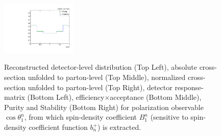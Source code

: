\begin{figure}[htb]
\begin{center}
 \includegraphics[width=0.32\textwidth]{fig_fullRun2UL/unfolding/combined/PurStab_b1n.pdf} \\
\caption{Reconstructed detector-level distribution (Top Left), absolute cross-section unfolded to parton-level (Top Middle), normalized cross-section unfolded to parton-level (Top Right), detector response-matrix (Bottom Left), efficiency$\times$acceptance (Bottom Middle), Purity and Stability (Bottom Right) for polarization observable $\cos\theta_{1}^{n}$, from which spin-density coefficient $B_{1}^{n}$ (sensitive to spin-density coefficient function $b_n^{+}$) is extracted.}
\label{fig:b1n}
\end{center}
\end{figure}
\clearpage
